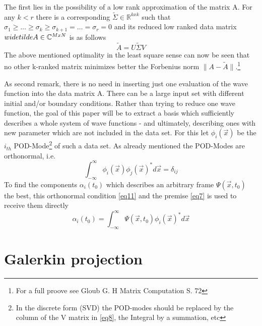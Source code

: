 \documentclass[usenatbib]{mn2e}
\begin{document}
The first lies in the possibility of a low rank approximation of the matrix A. For any \(k<r\) there is a corresponding \(\widetilde{\Sigma} \in \mathbb{R}^{kxk} \) such that \(\sigma_1 \geq \dots \geq \sigma_k \geq \sigma_{k+1} = \dots = \sigma_r =0\) and its reduced low ranked data matrix \(\\widetilde{A} \in \mathbb{C}^{MxN} \) is as follows
\begin{equation}\label{eq10}
\widetilde{A}=U \widetilde{\Sigma} V
\end{equation} 
The above mentioned optimality in the least square sense can now be seen that no other k-ranked matrix minimizes better the Forbenius norm \(\| A-\widetilde{A} \|\).\footnote{For a full proove see Gloub G. H  Matrix Computation S. 72}

 As second remark, there is no need in inserting just one evaluation of the wave function into the data matrix A. There can be a large input set with different initial and/or boundary conditions. Rather than trying to reduce one wave function, the goal of this paper will be to extract a basis which sufficiently  describes a whole system of wave functions - and ultimately, describing ones with new parameter which are not included in the data set. For this let \(\phi_i(\overrightarrow{x})\) be the \(i_{th}\) POD-Mode\footnote{In the discrete form (SVD) the POD-modes should be replaced by the column of the V matrix in \ref{eq8}, the Integral by a summation, etc}
 of such a data set. As already mentioned the POD-Modes are orthonormal, i.e.
 \begin{equation}\label{eq11}
\int_{-\infty}^\infty \phi_i(\overrightarrow{x})  \phi_j(\overrightarrow{x})^* d\overrightarrow{x} = \delta_{ij} 
\end{equation} 
To find the components \(\alpha_i(t_0)\) which describes an arbitrary frame \(\Psi(\overrightarrow{x},t_0)\) the best, this orthonormal condition \ref{eq11} and the premise \ref{eq7} is used to receive them directly
 \begin{equation}\label{eq12}
\alpha_i(t_0) =\int_{-\infty}^\infty \Psi(\overrightarrow{x},t_0) \phi_i(\overrightarrow{x})^* d\overrightarrow{x}
\end{equation} 

\section{Galerkin projection}



\def\aap{A\&A}
\def\araa{ARA\&A}
\def\apjl{APJL}
\def\mnras{MNRAS}
\def\nat{Nature}
\def\prd{Phys Rev D}


\end{document}
